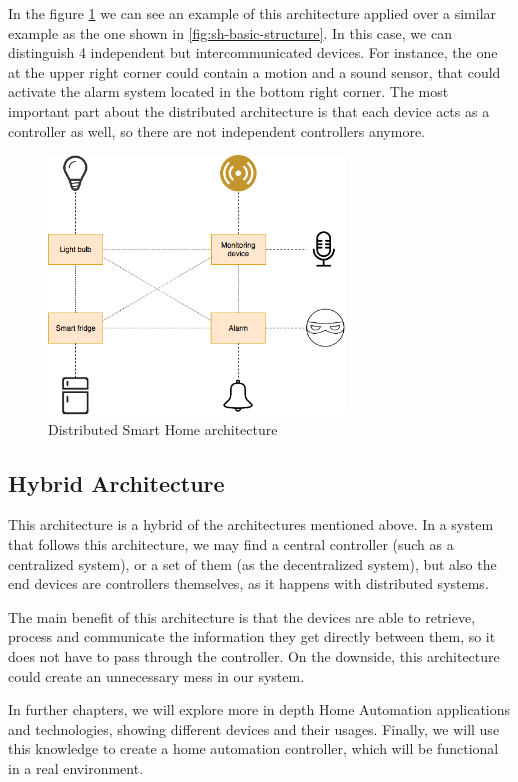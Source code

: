 In the figure \ref{fig:distributed-sh-architecture} we can see an example of this architecture applied over a similar example as the one
shown in \ref{fig:sh-basic-structure}. In this case, we can distinguish 4 independent but intercommunicated devices. For instance,
the one at the upper right corner could contain a motion and a sound sensor, that could activate the alarm system located in the bottom
right corner. The most important part about the distributed architecture is that each device acts as a controller as well, so there are not
independent controllers anymore.

\begin{figure}
	\centering
	\includegraphics[width=0.7\textwidth]{images/Chapter_03/distributed-sh-architecture.png}
	\caption{Distributed Smart Home architecture}
	\label{fig:distributed-sh-architecture}
\end{figure}

\subsection{Hybrid Architecture}
This architecture is a hybrid of the architectures mentioned above. In a system that follows this architecture, we may find
a central controller (such as a centralized system), or a set of them (as the decentralized system), but also the end devices are
controllers themselves, as it happens with distributed systems.

The main benefit of this architecture is that the devices are able to retrieve, process and communicate the information they get
directly between them, so it does not have to pass through the controller. On the downside, this architecture could create an
unnecessary mess in our system.

\bigskip
In further chapters, we will explore more in depth Home Automation applications and technologies, showing different devices and
their usages. Finally, we will use this knowledge to create a home automation controller, which will be functional in a real environment.
